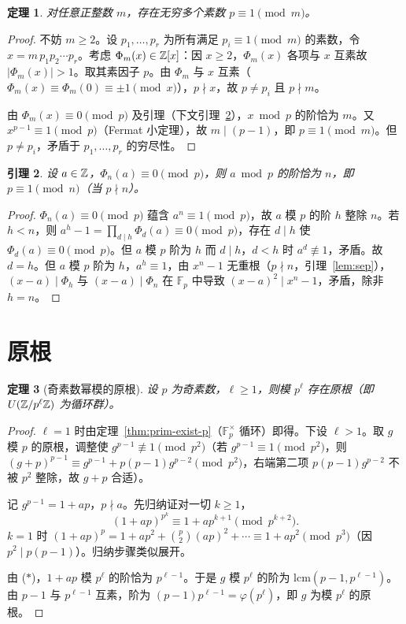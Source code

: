 \documentclass{article}
\theoremstyle{plain}
\newtheorem{thm}{定理}[section]
\newtheorem{lem}[thm]{引理}
\theoremstyle{definition}
\theoremstyle{remark}
\begin{document}
\begin{thm}\label{thm:prime-residue}
  对任意正整数 $m$，存在无穷多个素数 $p\equiv1\pmod m$。
\end{thm}

\begin{proof}
  不妨 $m\ge2$。设 $p_1,\dots,p_r$ 为所有满足 $p_i\equiv1\pmod m$ 的素数，令 $x=m\,p_1p_2\cdots p_r$。考虑 $\Phi_m(x)\in\mathbb{Z}[x]$：因 $x\ge2$，$\Phi_m(x)$ 各项与 $x$ 互素故 $|\Phi_m(x)|>1$。取其素因子 $p$。由 $\Phi_m$ 与 $x$ 互素（$\Phi_m(x)\equiv\Phi_m(0)\equiv\pm1\pmod x$），$p\nmid x$，故 $p\ne p_i$ 且 $p\nmid m$。

  由 $\Phi_m(x)\equiv0\pmod p$ 及引理（下文引理~\ref{lem:cyclo-residue}），$x\bmod p$ 的阶恰为 $m$。又 $x^{p-1}\equiv1\pmod p$（Fermat 小定理），故 $m\mid(p-1)$，即 $p\equiv1\pmod m$。但 $p\ne p_i$，矛盾于 $p_1,\dots,p_r$ 的穷尽性。
\end{proof}

\begin{lem}\label{lem:cyclo-residue}
  设 $a\in\mathbb{Z}$，$\Phi_n(a)\equiv0\pmod p$，则 $a\bmod p$ 的阶恰为 $n$，即 $p\equiv1\pmod n$（当 $p\nmid n$）。
\end{lem}

\begin{proof}
  $\Phi_n(a)\equiv0\pmod p$ 蕴含 $a^n\equiv1\pmod p$，故 $a$ 模 $p$ 的阶 $h$ 整除 $n$。若 $h<n$，则 $a^h-1=\prod_{d\mid h}\Phi_d(a)\equiv0\pmod p$，存在 $d\mid h$ 使 $\Phi_d(a)\equiv0\pmod p$。但 $a$ 模 $p$ 阶为 $h$ 而 $d\mid h$，$d<h$ 时 $a^d\not\equiv1$，矛盾。故 $d=h$。但 $a$ 模 $p$ 阶为 $h$，$a^h\equiv1$，由 $x^n-1$ 无重根（$p\nmid n$，引理~\ref{lem:sep}），$(x-a)\mid\Phi_h$ 与 $(x-a)\mid\Phi_n$ 在 $\mathbb{F}_p$ 中导致 $(x-a)^2\mid x^n-1$，矛盾，除非 $h=n$。
\end{proof}

\section{原根}

\begin{thm}[奇素数幂模的原根]\label{thm:prim-odd}
  设 $p$ 为奇素数，$\ell\ge1$，则模 $p^\ell$ 存在原根（即 $U(\mathbb{Z}/p^\ell\mathbb{Z})$ 为循环群）。
\end{thm}

\begin{proof}
  $\ell=1$ 时由定理~\ref{thm:prim-exist-p}（$\mathbb{F}_p^\times$ 循环）即得。下设 $\ell>1$。取 $g$ 模 $p$ 的原根，调整使 $g^{p-1}\not\equiv1\pmod{p^2}$（若 $g^{p-1}\equiv1\pmod{p^2}$，则 $(g+p)^{p-1}\equiv g^{p-1}+p(p-1)g^{p-2}\pmod{p^2}$，右端第二项 $p(p-1)g^{p-2}$ 不被 $p^2$ 整除，故 $g+p$ 合适）。

  记 $g^{p-1}=1+ap$，$p\nmid a$。先归纳证对一切 $k\ge1$，
  \[
    (1+ap)^{p^k}\equiv1+ap^{k+1}\pmod{p^{k+2}}. \tag{$*$}
  \]
  $k=1$ 时 $(1+ap)^p=1+ap^2+\binom p2(ap)^2+\cdots\equiv1+ap^2\pmod{p^3}$（因 $p^2\mid p(p-1)$）。归纳步骤类似展开。

  由 ($*$)，$1+ap$ 模 $p^\ell$ 的阶恰为 $p^{\ell-1}$。于是 $g$ 模 $p^\ell$ 的阶为 $\mathrm{lcm}(p-1,p^{\ell-1})$。由 $p-1$ 与 $p^{\ell-1}$ 互素，阶为 $(p-1)p^{\ell-1}=\varphi(p^\ell)$，即 $g$ 为模 $p^\ell$ 的原根。
\end{proof}
\end{document}
